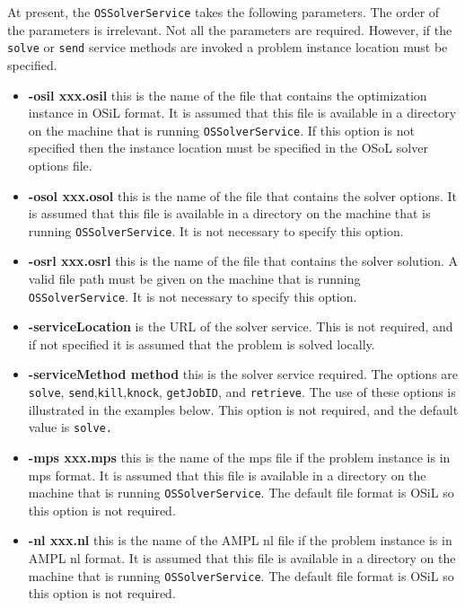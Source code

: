 \documentclass[11pt]{article}
\renewcommand{\_}{{\char"5F}}
\renewcommand{\{}{{\char"7B}}
\renewcommand{\}}{{\char"7D}}
\renewcommand{\^}{{\char"0D}}
\renewcommand{\'}{{\char"0D}}
\begin{document}
At present, the {\tt OSSolverService} takes the following parameters. The order of the parameters is irrelevant.  Not all the parameters are required. However, if the {\tt solve} or {\tt send} service methods are invoked a problem instance location must be specified. 

\begin{itemize}

\item[] {\bf -osil xxx.osil}  this is the name of the file that contains the optimization instance in OSiL format. It is assumed that this file is available in a directory on the machine that is running {\tt OSSolverService}. If this option is not specified then the instance location must be specified in the OSoL solver options file.

\item[] {\bf -osol xxx.osol}  this is the name of the file that contains the solver options. It is assumed that this file is available in a directory on the machine that is running {\tt OSSolverService}. It is not necessary to specify this option.

\item[] {\bf -osrl xxx.osrl}  this is the name of the file that contains the solver solution. A valid file path must be given on the machine that is running {\tt OSSolverService}. It is not necessary to specify this option.

\item[] {\bf -serviceLocation}  is the URL of the solver service. This is not required, and if not specified it is assumed that the problem is solved locally. 

\item[] {\bf -serviceMethod  method}  this is  the solver service required. The options are {\tt solve}, {\tt send},{\tt kill},{\tt knock}, {\tt getJobID}, and {\tt retrieve}. The use of these options is illustrated in the examples below. This option is not required, and the default value is {\tt solve.}

\item[] {\bf -mps  xxx.mps}  this is the name of the mps file if the problem instance is in mps format. It is assumed that this file is available in a directory on the machine that is running {\tt OSSolverService}. The default file format is OSiL so this option is not required.

\item[] {\bf -nl  xxx.nl}  this is the name of the AMPL nl file if the problem instance is in AMPL nl  format. It is assumed that this file is available in a directory on the machine that is running {\tt OSSolverService}. The default file format is OSiL so this option is not required.


\end{itemize}
\end{document}
